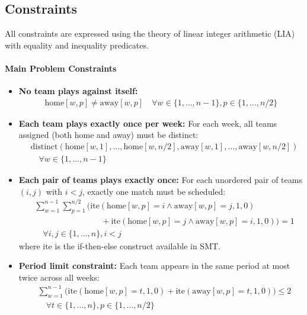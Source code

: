 \documentclass[11pt]{article}
\begin{document}
\subsection{Constraints}

All constraints are expressed using the theory of linear integer arithmetic (LIA) with equality and inequality predicates.

\paragraph{Main Problem Constraints}

\begin{itemize}
    \item \textbf{No team plays against itself:}
    \begin{align}
        \text{home}[w,p] \neq \text{away}[w,p] \quad \forall w \in \{1, \ldots, n-1\}, p \in \{1, \ldots, n/2\}
    \end{align}

    \item \textbf{Each team plays exactly once per week:}
    For each week, all teams assigned (both home and away) must be distinct:
    \begin{align}
        &\text{distinct}(\text{home}[w,1], \ldots, \text{home}[w,n/2], \text{away}[w,1], \ldots, \text{away}[w,n/2]) \\
        &\quad \forall w \in \{1, \ldots, n-1\}
    \end{align}

    \item \textbf{Each pair of teams plays exactly once:}
    For each unordered pair of teams $(i,j)$ with $i < j$, exactly one match must be scheduled:
    \begin{align}
        &\sum_{w=1}^{n-1} \sum_{p=1}^{n/2} \Big( \text{ite}(\text{home}[w,p] = i \land \text{away}[w,p] = j, 1, 0) \\
        &\qquad\qquad\qquad\qquad + \text{ite}(\text{home}[w,p] = j \land \text{away}[w,p] = i, 1, 0) \Big) = 1 \\
        &\quad \forall i,j \in \{1, \ldots, n\}, i < j
    \end{align}
    where $\text{ite}$ is the if-then-else construct available in SMT.

    \item \textbf{Period limit constraint:}
    Each team appears in the same period at most twice across all weeks:
    \begin{align}
        &\sum_{w=1}^{n-1} \Big( \text{ite}(\text{home}[w,p] = t, 1, 0) + \text{ite}(\text{away}[w,p] = t, 1, 0) \Big) \leq 2 \\
        &\quad \forall t \in \{1, \ldots, n\}, p \in \{1, \ldots, n/2\}
    \end{align}
\end{itemize}
\end{document}
